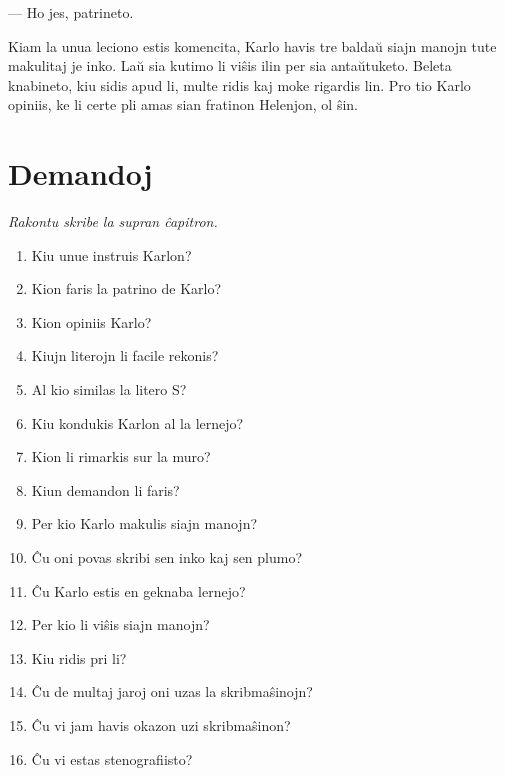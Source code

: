 — Ho jes, patrineto.

Kiam la unua leciono estis komencita, Karlo havis tre baldaŭ siajn manojn tute makulitaj je inko. Laŭ sia kutimo li viŝis ilin per sia antaŭtuketo. Beleta knabineto, kiu sidis apud li, multe ridis kaj moke rigardis lin. Pro tio Karlo opiniis, ke li certe pli amas sian fratinon Helenjon, ol ŝin.

\newpage

\section*{Demandoj}

\emph{Rakontu skribe la supran ĉapitron.}

\begin{enumerate}
    \item  Kiu unue instruis Karlon?
    \item  Kion faris la patrino de Karlo?
    \item  Kion opiniis Karlo?
    \item  Kiujn literojn li facile rekonis?
    \item  Al kio similas la litero S?
    \item  Kiu kondukis Karlon al la lernejo?
    \item  Kion li rimarkis sur la muro?
    \item  Kiun demandon li faris?
    \item  Per kio Karlo makulis siajn manojn?
    \item  Ĉu oni povas skribi sen inko kaj sen plumo?
    \item  Ĉu Karlo estis en geknaba lernejo?
    \item  Per kio li viŝis siajn manojn?
    \item  Kiu ridis pri li?
    \item  Ĉu de multaj jaroj oni uzas la skribmaŝinojn?
    \item  Ĉu vi jam havis okazon uzi skribmaŝinon?
    \item  Ĉu vi estas stenografiisto?
\end{enumerate}
